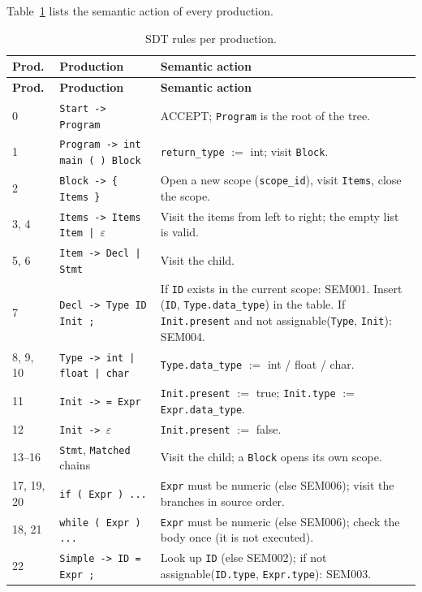 \documentclass[11pt,letterpaper]{article}
\begin{document}
Table~\ref{tab:sdt} lists the semantic action of every production.

{\small
\begin{longtable}{@{}p{1.6cm}p{4.3cm}p{9.2cm}@{}}
\caption{SDT rules per production.}\label{tab:sdt}\\
\toprule
\textbf{Prod.} & \textbf{Production} & \textbf{Semantic action}\\
\midrule
\endfirsthead
\toprule
\textbf{Prod.} & \textbf{Production} & \textbf{Semantic action}\\
\midrule
\endhead
0 & \texttt{Start -> Program} & ACCEPT; \texttt{Program} is the root of the tree. \\
1 & \texttt{Program -> int main ( ) Block} & \texttt{return\_type} $:=$ int; visit \texttt{Block}. \\
2 & \texttt{Block -> \{ Items \}} & Open a new scope (\texttt{scope\_id}), visit \texttt{Items}, close the scope. \\
3, 4 & \texttt{Items -> Items Item | $\varepsilon$} & Visit the items from left to right; the empty list is valid. \\
5, 6 & \texttt{Item -> Decl | Stmt} & Visit the child. \\
7 & \texttt{Decl -> Type ID Init ;} & If \texttt{ID} exists in the current scope: SEM001. Insert (\texttt{ID}, \texttt{Type.data\_type}) in the table. If \texttt{Init.present} and not assignable(\texttt{Type}, \texttt{Init}): SEM004. \\
8, 9, 10 & \texttt{Type -> int | float | char} & \texttt{Type.data\_type} $:=$ int / float / char. \\
11 & \texttt{Init -> = Expr} & \texttt{Init.present} $:=$ true; \texttt{Init.type} $:=$ \texttt{Expr.data\_type}. \\
12 & \texttt{Init -> $\varepsilon$} & \texttt{Init.present} $:=$ false. \\
13--16 & \texttt{Stmt}, \texttt{Matched} chains & Visit the child; a \texttt{Block} opens its own scope. \\
17, 19, 20 & \texttt{if ( Expr ) ...} & \texttt{Expr} must be numeric (else SEM006); visit the branches in source order. \\
18, 21 & \texttt{while ( Expr ) ...} & \texttt{Expr} must be numeric (else SEM006); check the body once (it is not executed). \\
22 & \texttt{Simple -> ID = Expr ;} & Look up \texttt{ID} (else SEM002); if not assignable(\texttt{ID.type}, \texttt{Expr.type}): SEM003. \\

\end{longtable}}
\end{document}
